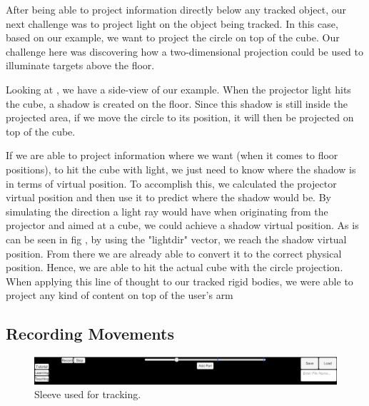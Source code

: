 
After being able to project information directly below any tracked object, our next challenge was to project light on the object being tracked. 
In this case, based on our example, we want to project the circle on top of the cube. 
Our challenge here was discovering how a two-dimensional projection could be used to illuminate targets above the floor.



Looking at , we have a side-view of our example. When the projector light hits the cube, a shadow is created on the floor. 
Since this shadow is still inside the projected area, if we move the circle to its position, it will then be projected on top of the cube.

If we are able to project information where we want (when it comes to floor positions), to hit the cube with light, we just need to know where the shadow is in terms of virtual position. 
To accomplish this, we calculated the projector virtual position and then use it to predict where the shadow would be. 
By simulating the direction a light ray would have when originating from the projector and aimed at a cube, we could achieve a shadow virtual position. 
As is can be seen in fig , by using the "lightdir" vector, we reach the shadow virtual position. 
From there we are already able to convert it to the correct physical position. Hence, we are able to hit the actual cube with the circle projection.
When applying this line of thought to our tracked rigid bodies, we were able to project any kind of content on top of the user's arm

\subsection{Recording Movements}

\begin{figure}[!t]
    \begin{center}
        \includegraphics[width=\textwidth]{imgs/impl/recordinginterface}
    \end{center}
    \caption{Sleeve used for tracking.}
    \label{fig:recordinginterface}
\end{figure}


